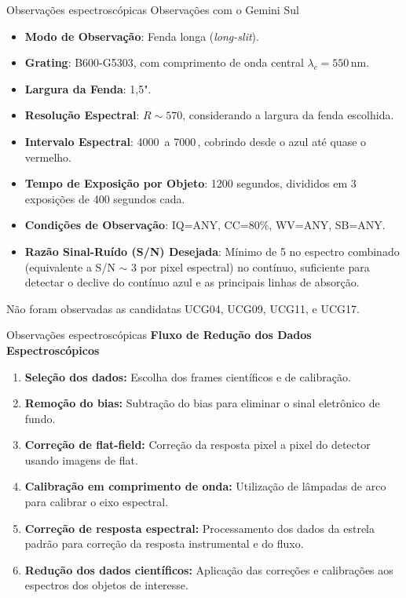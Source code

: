 \begin{frame}[c]{Observações espectroscópicas}
Observações com o Gemini Sul
\footnotesize
\begin{itemize}
    \item \textbf{Modo de Observação}: Fenda longa (\textit{long-slit}).
    \item \textbf{Grating}: B600-G5303, com comprimento de onda central $\lambda_c = 550 \, \text{nm}$.
    \item \textbf{Largura da Fenda}: 1,5".
    \item \textbf{Resolução Espectral}: $R \sim 570$, considerando a largura da fenda escolhida.
    \item \textbf{Intervalo Espectral}: 4000\, a 7000\,, cobrindo desde o azul até quase o vermelho.
    \item \textbf{Tempo de Exposição por Objeto}: 1200 segundos, divididos em 3 exposições de 400 segundos cada.
    \item \textbf{Condições de Observação}: IQ=ANY, CC=80\%, WV=ANY, SB=ANY.
    \item \textbf{Razão Sinal-Ruído (S/N) Desejada}: Mínimo de 5 no espectro combinado (equivalente a S/N $\sim$ 3 por pixel espectral) no contínuo, suficiente para detectar o declive do contínuo azul e as principais linhas de absorção.
\end{itemize}

{\scriptsize Não foram observadas as candidatas UCG04, UCG09, UCG11, e UCG17.}
\end{frame}

\begin{frame}[c]{Observações espectroscópicas}
\textbf{Fluxo de Redução dos Dados Espectroscópicos}

\begin{enumerate}
    \item \textbf{Seleção dos dados:} Escolha dos frames científicos e de calibração.
    \item \textbf{Remoção do bias:} Subtração do bias para eliminar o sinal eletrônico de fundo.
    \item \textbf{Correção de flat-field:} Correção da resposta pixel a pixel do detector usando imagens de flat.
    \item \textbf{Calibração em comprimento de onda:} Utilização de lâmpadas de arco para calibrar o eixo espectral.
    \item \textbf{Correção de resposta espectral:} Processamento dos dados da estrela padrão para correção da resposta instrumental e do fluxo.
    \item \textbf{Redução dos dados científicos:} Aplicação das correções e calibrações aos espectros dos objetos de interesse.
\end{enumerate}

\end{frame}

